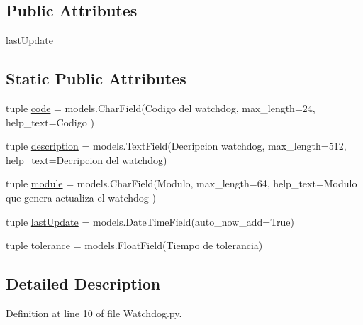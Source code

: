\subsection*{Public Attributes}
\begin{DoxyCompactItemize}
\item 
\hyperlink{class_ground_segment_1_1models_1_1_watchdog_1_1_watchdog_a1c3ed2ac40ff216074da715ad3f5eb8a}{last\+Update}
\end{DoxyCompactItemize}
\subsection*{Static Public Attributes}
\begin{DoxyCompactItemize}
\item 
tuple \hyperlink{class_ground_segment_1_1models_1_1_watchdog_1_1_watchdog_a9548413d6e37739ac54bdaa3a75d66f4}{code} = models.\+Char\+Field(\textquotesingle{}Codigo del watchdog\textquotesingle{}, max\+\_\+length=24, help\+\_\+text=\textquotesingle{}Codigo\textquotesingle{} )
\item 
tuple \hyperlink{class_ground_segment_1_1models_1_1_watchdog_1_1_watchdog_ab6bf4dee4015f39a9c62850ee3ca830e}{description} = models.\+Text\+Field(\textquotesingle{}Decripcion watchdog\textquotesingle{}, max\+\_\+length=512, help\+\_\+text=\textquotesingle{}Decripcion del watchdog\textquotesingle{})
\item 
tuple \hyperlink{class_ground_segment_1_1models_1_1_watchdog_1_1_watchdog_ad2304bdf1d4275622b13386e224550a3}{module} = models.\+Char\+Field(\textquotesingle{}Modulo\textquotesingle{}, max\+\_\+length=64, help\+\_\+text=\textquotesingle{}Modulo que genera actualiza el watchdog\textquotesingle{} )
\item 
tuple \hyperlink{class_ground_segment_1_1models_1_1_watchdog_1_1_watchdog_ac6ffa32a8b52ba04c20b99b0e4567bd5}{last\+Update} = models.\+Date\+Time\+Field(auto\+\_\+now\+\_\+add=True)
\item 
tuple \hyperlink{class_ground_segment_1_1models_1_1_watchdog_1_1_watchdog_abb2ac1834f5367e279b537108087a4f8}{tolerance} = models.\+Float\+Field(\textquotesingle{}Tiempo de tolerancia\textquotesingle{})
\end{DoxyCompactItemize}


\subsection{Detailed Description}


Definition at line 10 of file Watchdog.\+py.



